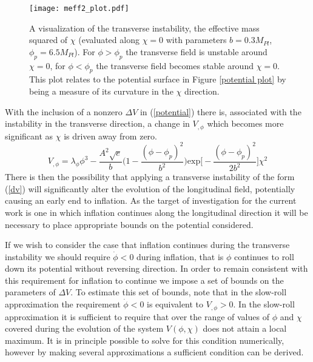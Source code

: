 \documentclass[letterpaper,11pt]{article}
\begin{document}
\begin{figure}
\begin{center}
\texttt{[image: meff2\_plot.pdf]}
\caption{A visualization of the transverse instability, the effective mass squared of $\chi$ (evaluated along $\chi=0$ with parameters $b=0.3M_{Pl}$, $\phi_p=6.5M_{Pl}$). For $\phi>\phi_p$ the transverse field is unstable around $\chi=0$, for $\phi<\phi_p$ the transverse field becomes stable around $\chi=0$. This plot relates to the potential surface in Figure \ref{potential plot} by being a measure of its curvature in the $\chi$ direction.}
\label{meff2 plot}
\end{center}
\end{figure}

With the inclusion of a nonzero $\Delta V$ in (\ref{potential}) there is, associated with the instability in the transverse direction, a change in $V_{,\phi}$ which becomes more significant as $\chi$ is driven away from zero.
\begin{equation}
V_{,\phi} = \lambda_{\phi}\phi^3 - \frac{A^2\sqrt{e}}{b}\bigg(1 - \frac{(\phi-\phi_p)^2}{b^2}\bigg)\mathrm{exp}\bigg[-\frac{(\phi-\phi_p)^2}{2b^2}\bigg]\chi^2 \label{dv phi}
\end{equation}
There is then the possibility that applying a transverse instability of the form (\ref{dv}) will significantly alter the evolution of the longitudinal field, potentially causing an early end to inflation. As the target of investigation for the current work is one in which inflation continues along the longitudinal direction it will be necessary to place appropriate bounds on the potential considered.

If we wish to consider the case that inflation continues during the transverse instability we should require $\dot{\phi}<0$ during inflation, that is $\phi$ continues to roll down its potential without reversing direction. In order to remain consistent with this requirement for inflation to continue we impose a set of bounds on the parameters of $\Delta V$. To estimate this set of bounds, note that in the slow-roll approximation the requirement $\dot{\phi}<0$ is equivalent to $V_{,\phi}>0$. In the slow-roll approximation it is sufficient to require that over the range of values of $\phi$ and $\chi$ covered during the evolution of the system $V(\phi, \chi)$ does not attain a local maximum. It is in principle possible to solve for this condition numerically, however by making several approximations a sufficient condition can be derived.
\end{document}
